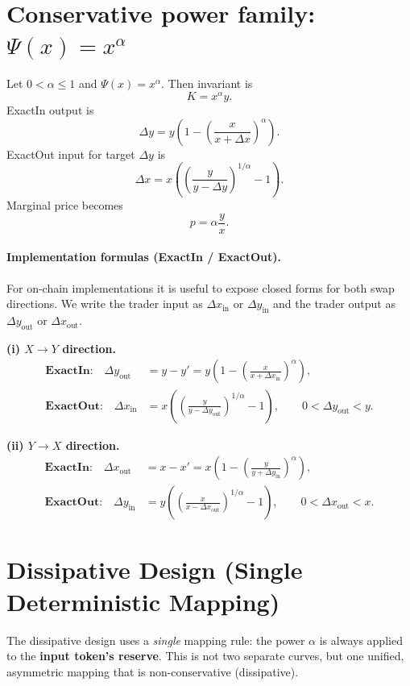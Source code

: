 \documentclass[11pt]{article}
\theoremstyle{definition}
\theoremstyle{remark}
\newcommand{\dx}{\Delta x}
\newcommand{\dy}{\Delta y}
\begin{document}
\section{Conservative power family: $\Psi(x)=x^\alpha$}\label{sec:power-family}

Let $0<\alpha\le 1$ and $\Psi(x)=x^\alpha$. Then invariant is
\[
\boxed{K=x^\alpha y.}
\]
ExactIn output is
\[
\boxed{\Delta y = y\left(1-\left(\frac{x}{x+\dx}\right)^\alpha\right).}
\]
ExactOut input for target $\dy$ is
\[
\boxed{\dx = x\left(\left(\frac{y}{y-\dy}\right)^{1/\alpha}-1\right).}
\]
Marginal price becomes
\[
\boxed{p=\alpha\frac{y}{x}.}
\]


\paragraph{Implementation formulas (ExactIn / ExactOut).}
For on-chain implementations it is useful to expose closed forms for both swap directions.
We write the trader input as \(\dx_{\mathrm{in}}\) or \(\dy_{\mathrm{in}}\) and the trader output as \(\dy_{\mathrm{out}}\) or \(\dx_{\mathrm{out}}\).

\textbf{(i) \(X \to Y\) direction.}
\begin{align}
\textbf{ExactIn:}\quad
\dy_{\mathrm{out}}
&= y - y'
= y\left(1 - \left(\frac{x}{x+\dx_{\mathrm{in}}}\right)^{\alpha}\right),
\\[4pt]
\textbf{ExactOut:}\quad
\dx_{\mathrm{in}}
&= x\left(\left(\frac{y}{y-\dy_{\mathrm{out}}}\right)^{1/\alpha}-1\right),
\qquad 0<\dy_{\mathrm{out}}<y.
\end{align}

\textbf{(ii) \(Y \to X\) direction.}
\begin{align}
\textbf{ExactIn:}\quad
\dx_{\mathrm{out}}
&= x - x'
= x\left(1 - \left(\frac{y}{y+\dy_{\mathrm{in}}}\right)^{\alpha}\right),
\\[4pt]
\textbf{ExactOut:}\quad
\dy_{\mathrm{in}}
&= y\left(\left(\frac{x}{x-\dx_{\mathrm{out}}}\right)^{1/\alpha}-1\right),
\qquad 0<\dx_{\mathrm{out}}<x.
\end{align}

\section{Dissipative Design (Single Deterministic Mapping)}\label{sec:dissipative}

The dissipative design uses a \emph{single} mapping rule: the power $\alpha$ is always applied to the \textbf{input token's reserve}.
This is not two separate curves, but one unified, asymmetric mapping that is non-conservative (dissipative).
\end{document}
